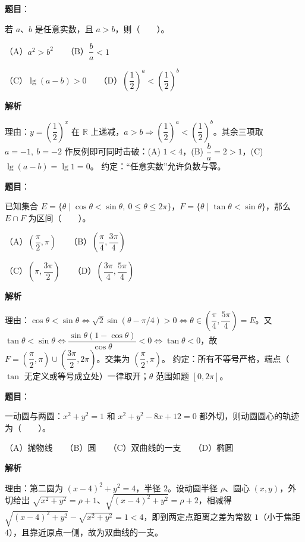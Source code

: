 \begin{answer}

\textbf{题目}：

若 $a\text{、}b$ 是任意实数，且 $a>b$，则\mbox{（　　）}。

（A）$a^2>b^2$　　（B）$\dfrac ba<1$

（C）$\lg(a-b)>0$　　（D）$\left(\dfrac12\right)^a<\left(\dfrac12\right)^b$

\textbf{解析}

理由：$y=\left(\dfrac12\right)^x$ 在 $\mathbb R$ 上递减，$a>b\Rightarrow\left(\dfrac12\right)^a<\left(\dfrac12\right)^b$。其余三项取 $a=-1,\ b=-2$ 作反例即可同时击破：(A) $1<4$，(B) $\dfrac ba=2>1$，(C) $\lg(a-b)=\lg1=0$。
约定：“任意实数”允许负数与零。


\end{answer}
\begin{answer}

\textbf{题目}：

已知集合 $E=\{\theta\mid \cos\theta<\sin\theta,\ 0\le\theta\le2\pi\}$，$F=\{\theta\mid\tan\theta<\sin\theta\}$，那么 $E\cap F$ 为区间\mbox{（　　）}。

（A）$\left(\dfrac\pi2,\pi\right)$　　（B）$\left(\dfrac\pi4,\dfrac{3\pi}4\right)$

（C）$\left(\pi,\dfrac{3\pi}2\right)$　　（D）$\left(\dfrac{3\pi}4,\dfrac{5\pi}4\right)$

\textbf{解析}

理由：$\cos\theta<\sin\theta\iff\sqrt2\sin(\theta-\pi/4)>0\iff\theta\in\left(\dfrac\pi4,\dfrac{5\pi}4\right)=E$。又 $\tan\theta<\sin\theta\iff\dfrac{\sin\theta(1-\cos\theta)}{\cos\theta}<0\iff\tan\theta<0$，故 $F=\left(\dfrac\pi2,\pi\right)\cup\left(\dfrac{3\pi}2,2\pi\right)$。交集为 $\left(\dfrac\pi2,\pi\right)$。
约定：所有不等号严格，端点（$\tan$ 无定义或等号成立处）一律取开；$\theta$ 范围如题 $[0,2\pi]$。


\end{answer}
\begin{answer}

\textbf{题目}：

一动圆与两圆：$x^2+y^2=1$ 和 $x^2+y^2-8x+12=0$ 都外切，则动圆圆心的轨迹为\mbox{（　　）}。

（A）抛物线　　（B）圆　　（C）双曲线的一支　　（D）椭圆

\textbf{解析}

理由：第二圆为 $(x-4)^2+y^2=4$，半径 $2$。设动圆半径 $\rho$、圆心 $(x,y)$，外切给出 $\sqrt{x^2+y^2}=\rho+1$、$\sqrt{(x-4)^2+y^2}=\rho+2$，相减得 $\sqrt{(x-4)^2+y^2}-\sqrt{x^2+y^2}=1<4$，即到两定点距离之差为常数 $1$（小于焦距 $4$），且靠近原点一侧，故为双曲线的一支。


\end{answer}
